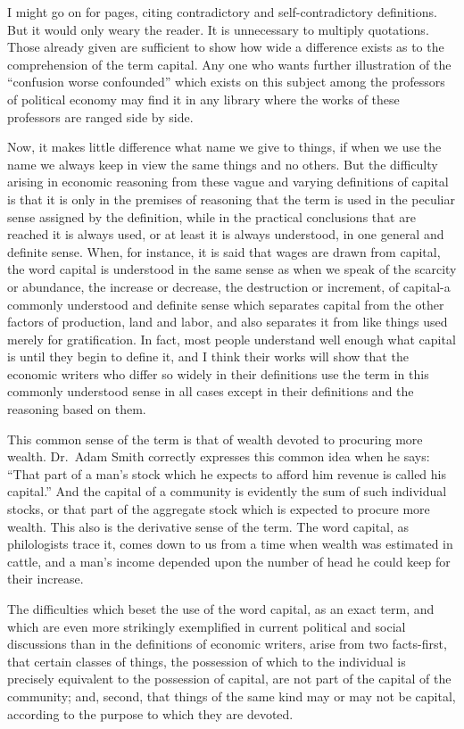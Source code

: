 I might go on for pages, citing contradictory and self-contradictory
definitions. But it would only weary the reader. It is unnecessary to
multiply quotations. Those already given are sufficient to show how wide
a difference exists as to the comprehension of the term capital. Any one
who wants further illustration of the ``confusion worse confounded''
which exists on this subject among the professors of political economy
may find it in any library where the works of these professors are
ranged side by side.

Now, it makes little difference what name we give to things, if when we
use the name we always keep in view the same things and no others. But
the difficulty arising in economic reasoning from these vague and
varying definitions of capital is that it is only in the premises of
reasoning that the term is used in the peculiar sense assigned by the
definition, while in the practical conclusions that are reached it is
always used, or at least it is always understood, in one general and
definite sense. When, for instance, it is said that wages are drawn from
capital, the word capital is understood in the same sense as when we
speak of the scarcity or abundance, the increase or decrease, the
destruction or increment, of capital-a commonly understood and definite
sense which separates capital from the other factors of production, land
and labor, and also separates it from like things used merely for
gratification. In fact, most people understand well enough what capital
is until they begin to define it, and I think their works will show that
the economic writers who differ so widely in their definitions use the
term in this commonly understood sense in all cases except in their
definitions and the reasoning based on them.

This common sense of the term is that of wealth devoted to procuring
more wealth. Dr.~Adam Smith correctly expresses this common idea when he
says: ``That part of a man's stock which he expects to afford him
revenue is called his capital.'' And the capital of a community is
evidently the sum of such individual stocks, or that part of the
aggregate stock which is expected to procure more wealth. This also is
the derivative sense of the term. The word capital, as philologists
trace it, comes down to us from a time when wealth was estimated in
cattle, and a man's income depended upon the number of head he could
keep for their increase.

The difficulties which beset the use of the word capital, as an exact
term, and which are even more strikingly exemplified in current
political and social discussions than in the definitions of economic
writers, arise from two facts-first, that certain classes of things, the
possession of which to the individual is precisely equivalent to the
possession of capital, are not part of the capital of the community;
and, second, that things of the same kind may or may not be capital,
according to the purpose to which they are devoted.

